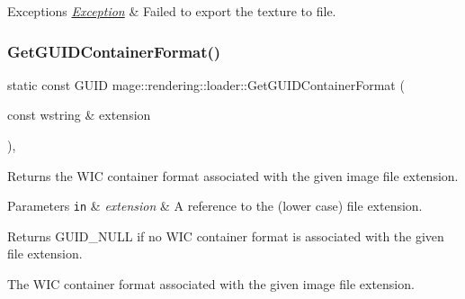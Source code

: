 \begin{DoxyExceptions}{Exceptions}
{\em \hyperlink{classmage_1_1_exception}{Exception}} & Failed to export the texture to file. \\
\hline
\end{DoxyExceptions}
\hypertarget{namespacemage_1_1rendering_1_1loader_a2e161011f6a18d7dbf4f4cc8688e2805}{}\label{namespacemage_1_1rendering_1_1loader_a2e161011f6a18d7dbf4f4cc8688e2805} 
\subsubsection{\texorpdfstring{Get\+G\+U\+I\+D\+Container\+Format()}{GetGUIDContainerFormat()}}
{\footnotesize\ttfamily static const G\+U\+ID mage\+::rendering\+::loader\+::\+Get\+G\+U\+I\+D\+Container\+Format (\begin{DoxyParamCaption}\item[{const wstring \&}]{extension }\end{DoxyParamCaption})\hspace{0.3cm}{\ttfamily [static]}, {\ttfamily [noexcept]}}

Returns the W\+IC container format associated with the given image file extension.


\begin{DoxyParams}[1]{Parameters}
\mbox{\tt in}  & {\em extension} & A reference to the (lower case) file extension. \\
\hline
\end{DoxyParams}
\begin{DoxyReturn}{Returns}
{\ttfamily G\+U\+I\+D\+\_\+\+N\+U\+LL} if no W\+IC container format is associated with the given file extension. 

The W\+IC container format associated with the given image file extension. 
\end{DoxyReturn}
\hypertarget{namespacemage_1_1rendering_1_1loader_a86772125cef425229a1adb3bc3a613f0}{}\label{namespacemage_1_1rendering_1_1loader_a86772125cef425229a1adb3bc3a613f0} 
